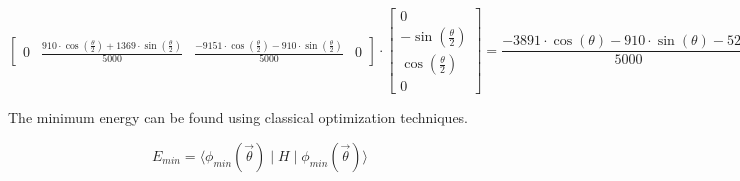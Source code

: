 \documentclass{article}
\begin{document}
\begin{itemize}
	      \[
		      \begin{bmatrix}
			      0 & \frac{910 \cdot \cos\left(\frac{\theta}{2}\right)+1369 \cdot \sin\left(\frac{\theta}{2}\right)}{5000} & \frac{-9151 \cdot \cos\left(\frac{\theta}{2}\right)-910 \cdot \sin\left(\frac{\theta}{2}\right)}{5000} & 0
		      \end{bmatrix}
		      \cdot
		      \begin{bmatrix}
			      0                        \\
			      - \sin(\frac{\theta}{2}) \\
			      \cos(\frac{\theta}{2})   \\
			      0
		      \end{bmatrix}
		      =  \frac{-3891 \cdot \cos\left(\theta\right)-910 \cdot \sin\left(\theta\right)-5260}{5000}
	      \]

	      The minimum energy can be found using classical optimization techniques.

	      \[E_{min} = \langle \phi_{min}(\vec{\theta}) \mid H \mid \phi_{min}(\vec{\theta}) \rangle\]
\end{itemize}
\end{document}
